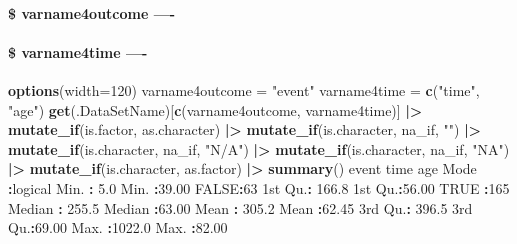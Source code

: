 \documentclass[
]{article}
\newenvironment{Shaded}{\begin{snugshade}}{\end{snugshade}}
\newcommand{\AttributeTok}[1]{\textcolor[rgb]{0.13,0.29,0.53}{#1}}
\newcommand{\ConstantTok}[1]{\textcolor[rgb]{0.56,0.35,0.01}{#1}}
\newcommand{\DecValTok}[1]{\textcolor[rgb]{0.00,0.00,0.81}{#1}}
\newcommand{\FloatTok}[1]{\textcolor[rgb]{0.00,0.00,0.81}{#1}}
\newcommand{\FunctionTok}[1]{\textcolor[rgb]{0.13,0.29,0.53}{\textbf{#1}}}
\newcommand{\NormalTok}[1]{#1}
\newcommand{\OtherTok}[1]{\textcolor[rgb]{0.56,0.35,0.01}{#1}}
\newcommand{\SpecialCharTok}[1]{\textcolor[rgb]{0.81,0.36,0.00}{\textbf{#1}}}
\newcommand{\StringTok}[1]{\textcolor[rgb]{0.31,0.60,0.02}{#1}}
\begin{document}
\hypertarget{varname4outcome--}{%
\paragraph{\$ varname4outcome ----}\label{varname4outcome--}}

\hypertarget{varname4time--}{%
\paragraph{\$ varname4time ----}\label{varname4time--}}

\begin{Shaded}
\begin{Highlighting}[]
\FunctionTok{options}\NormalTok{(}\AttributeTok{width=}\DecValTok{120}\NormalTok{)}
\NormalTok{varname4outcome }\OtherTok{=} \StringTok{"event"}
\NormalTok{varname4time }\OtherTok{=} \FunctionTok{c}\NormalTok{(}\StringTok{"time"}\NormalTok{, }\StringTok{"age"}\NormalTok{)}
\FunctionTok{get}\NormalTok{(.DataSetName)[}\FunctionTok{c}\NormalTok{(varname4outcome, varname4time)] }\SpecialCharTok{|\textgreater{}} 
    \FunctionTok{mutate\_if}\NormalTok{(is.factor, as.character) }\SpecialCharTok{|\textgreater{}}  
    \FunctionTok{mutate\_if}\NormalTok{(is.character, na\_if, }\StringTok{""}\NormalTok{) }\SpecialCharTok{|\textgreater{}} \FunctionTok{mutate\_if}\NormalTok{(is.character, na\_if, }\StringTok{"N/A"}\NormalTok{) }\SpecialCharTok{|\textgreater{}} \FunctionTok{mutate\_if}\NormalTok{(is.character, na\_if, }\StringTok{"NA"}\NormalTok{) }\SpecialCharTok{|\textgreater{}} 
    \FunctionTok{mutate\_if}\NormalTok{(is.character, as.factor) }\SpecialCharTok{|\textgreater{}} 
    \FunctionTok{summary}\NormalTok{()}
\NormalTok{   event              time             age       }
\NormalTok{ Mode }\SpecialCharTok{:}\NormalTok{logical   Min.   }\SpecialCharTok{:}   \FloatTok{5.0}\NormalTok{   Min.   }\SpecialCharTok{:}\FloatTok{39.00}  
 \ConstantTok{FALSE}\SpecialCharTok{:}\DecValTok{63}\NormalTok{        1st Qu.}\SpecialCharTok{:} \FloatTok{166.8}\NormalTok{   1st Qu.}\SpecialCharTok{:}\FloatTok{56.00}  
 \ConstantTok{TRUE} \SpecialCharTok{:}\DecValTok{165}\NormalTok{       Median }\SpecialCharTok{:} \FloatTok{255.5}\NormalTok{   Median }\SpecialCharTok{:}\FloatTok{63.00}  
\NormalTok{                 Mean   }\SpecialCharTok{:} \FloatTok{305.2}\NormalTok{   Mean   }\SpecialCharTok{:}\FloatTok{62.45}  
\NormalTok{                 3rd Qu.}\SpecialCharTok{:} \FloatTok{396.5}\NormalTok{   3rd Qu.}\SpecialCharTok{:}\FloatTok{69.00}  
\NormalTok{                 Max.   }\SpecialCharTok{:}\FloatTok{1022.0}\NormalTok{   Max.   }\SpecialCharTok{:}\FloatTok{82.00}  
\end{Highlighting}
\end{Shaded}
\end{document}
